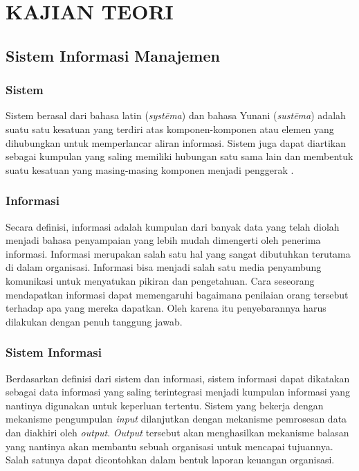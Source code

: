 
\chapter{KAJIAN TEORI}                

\section{Sistem Informasi Manajemen}
	\subsection{Sistem}
	Sistem berasal dari bahasa latin (\emph{systēma}) dan bahasa Yunani (\emph{sustēma}) adalah suatu satu kesatuan yang terdiri atas komponen-komponen atau elemen yang dihubungkan untuk memperlancar aliran informasi. Sistem juga dapat diartikan sebagai kumpulan yang saling memiliki hubungan satu sama lain dan membentuk suatu kesatuan yang masing-masing komponen menjadi penggerak \cite{zakky}.
	
	\subsection{Informasi}
	Secara definisi, informasi adalah kumpulan dari banyak data yang telah diolah menjadi bahasa penyampaian yang lebih mudah dimengerti oleh penerima informasi. Informasi merupakan salah satu hal yang sangat dibutuhkan terutama di dalam organisasi. Informasi bisa menjadi salah satu media penyambung komunikasi untuk menyatukan pikiran dan pengetahuan. Cara seseorang mendapatkan informasi dapat memengaruhi bagaimana penilaian orang tersebut terhadap apa yang mereka dapatkan. Oleh karena itu penyebarannya harus dilakukan dengan penuh tanggung jawab.
	
	\subsection{Sistem Informasi}
	Berdasarkan definisi dari sistem dan informasi, sistem informasi dapat dikatakan sebagai data informasi yang saling terintegrasi menjadi kumpulan informasi yang nantinya digunakan untuk keperluan tertentu. Sistem yang bekerja dengan mekanisme pengumpulan \emph{input} dilanjutkan dengan mekanisme pemrosesan data dan diakhiri oleh \emph{output}. \emph{Output} tersebut akan menghasilkan mekanisme balasan yang nantinya akan membantu sebuah organisasi untuk mencapai tujuannya. Salah satunya dapat dicontohkan dalam bentuk laporan keuangan organisasi.
	
